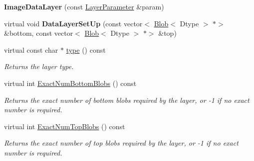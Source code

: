 \begin{DoxyCompactItemize}
{\bfseries Image\+Data\+Layer} (const \mbox{\hyperlink{classcaffe_1_1_layer_parameter}{Layer\+Parameter}} \&param)
\item 
\mbox{\label{classcaffe_1_1_image_data_layer_a07b1e14f1c8222cb057cae5b2c303ef0}} 
virtual void {\bfseries Data\+Layer\+Set\+Up} (const vector$<$ \mbox{\hyperlink{classcaffe_1_1_blob}{Blob}}$<$ Dtype $>$ $\ast$$>$ \&bottom, const vector$<$ \mbox{\hyperlink{classcaffe_1_1_blob}{Blob}}$<$ Dtype $>$ $\ast$$>$ \&top)
\item 
\mbox{\label{classcaffe_1_1_image_data_layer_ac856b2705f2b8f46669d66c7cca2e9ed}} 
virtual const char $\ast$ \mbox{\hyperlink{classcaffe_1_1_image_data_layer_ac856b2705f2b8f46669d66c7cca2e9ed}{type}} () const
\begin{DoxyCompactList}\small\item\em Returns the layer type. \end{DoxyCompactList}\item 
virtual int \mbox{\hyperlink{classcaffe_1_1_image_data_layer_a6776c86faf14e35ae7be9848c7012aa5}{Exact\+Num\+Bottom\+Blobs}} () const
\begin{DoxyCompactList}\small\item\em Returns the exact number of bottom blobs required by the layer, or -\/1 if no exact number is required. \end{DoxyCompactList}\item 
virtual int \mbox{\hyperlink{classcaffe_1_1_image_data_layer_aa9182d46877b8514fca86e3588249567}{Exact\+Num\+Top\+Blobs}} () const
\begin{DoxyCompactList}\small\item\em Returns the exact number of top blobs required by the layer, or -\/1 if no exact number is required. \end{DoxyCompactList}\end{DoxyCompactItemize}
